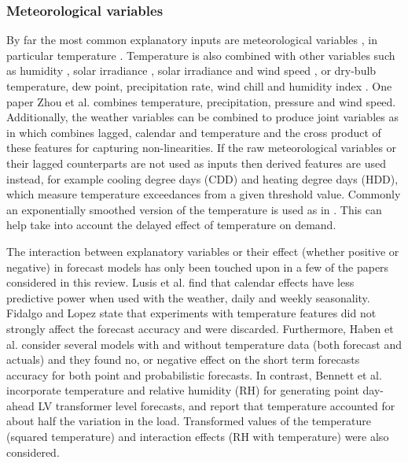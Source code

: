 \subsubsection{Meteorological variables}

By far the most common explanatory inputs are meteorological variables \cite{Jung2020bem}, in particular temperature \cite{hoverstad2015stl, kipping2016mad}. Temperature is also combined with other variables such as  humidity \cite{Marinescu2013RED}, solar irradiance \cite{dong2016ahm}, solar irradiance and wind speed \cite{larsen2017dre}, or dry-bulb temperature, dew point, precipitation rate, wind chill and humidity index \cite{lusis2017str}. One paper Zhou et al. \cite{zhou2019pse} combines temperature, precipitation, pressure and wind speed. Additionally, the weather variables can be combined to produce joint variables as in \cite{ding2016nnb} which combines lagged, calendar and temperature and the cross product of these features for capturing non-linearities.
If the raw meteorological variables or their lagged counterparts are not used as inputs then derived features are used instead, for example cooling degree days (CDD) and heating degree days (HDD), which measure temperature exceedances from a given threshold value. Commonly an exponentially smoothed version of the temperature is used as in \cite{larsen2017dre}. This can help take into account the delayed effect of temperature on demand.

The interaction between explanatory variables or their effect (whether positive or negative) in forecast models has only been touched upon in a few of the papers considered in this review. Lusis et al. \cite{lusis2017str} find that calendar effects have less predictive power when used with the weather, daily and weekly seasonality. Fidalgo and Lopez \cite{fidalgo2005lfp} state that experiments with temperature features did not strongly affect the forecast accuracy and were discarded. Furthermore, Haben et al. \cite{Haben2019stl} consider several models with and without temperature data (both forecast and actuals) and they found no, or negative effect on the short term forecasts accuracy for both point and probabilistic forecasts. In contrast, Bennett et al. \cite{Bennett2014flv} incorporate temperature and relative humidity (RH) for generating point day-ahead LV transformer level forecasts, and report that temperature accounted for about half the variation in the load. Transformed values of the temperature (squared temperature) and interaction effects (RH with temperature) were also considered.


